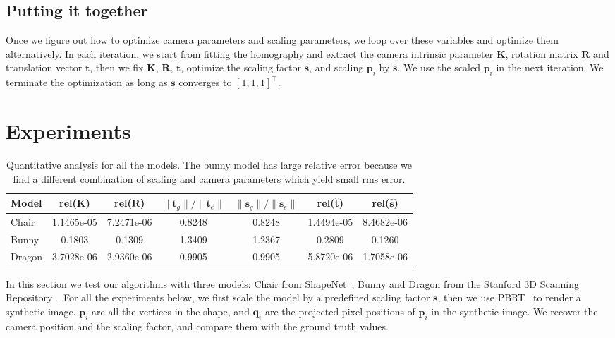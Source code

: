 \documentclass[10pt,twocolumn,letterpaper]{article}
\begin{document}
\subsection{Putting it together}

\noindent
Once we figure out how to optimize camera parameters and scaling parameters, we loop over these variables and optimize them alternatively. In each iteration, we start from fitting the homography and extract the camera intrinsic parameter $\mathbf{K}$, rotation matrix $\mathbf{R}$ and translation vector $\mathbf{t}$, then we fix $\mathbf{K}$, $\mathbf{R}$, $\mathbf{t}$, optimize the scaling factor $\mathbf{s}$, and scaling $\mathbf{p}_i$ by $\mathbf{s}$. We use the scaled $\mathbf{p}_i$ in the next iteration. We terminate the optimization as long as $\mathbf{s}$ converges to $[1,1,1]^\top$.

\section{Experiments}

\begin{table}[t]
\begin{center}
\begin{tabular}{|l|c|c|c|c|c|c|}
\hline
Model & rel($\mathbf{K}$) & rel($\mathbf{R}$) & $\|\mathbf{t}_g\|/\|\mathbf{t}_e\|$ & $\|\mathbf{s}_g\|/\|\mathbf{s}_e\|$ & rel($\hat{\mathbf{t}}$) & rel($\hat{\mathbf{s}}$) \\
\hline\hline
Chair & 1.1465e-05 & 7.2471e-06 & 0.8248 & 0.8248 & 1.4494e-05 & 8.4682e-06 \\
Bunny & 0.1803 & 0.1309 & 1.3409 & 1.2367 & 0.2809 & 0.1260 \\
Dragon & 3.7028e-06 & 2.9360e-06 & 0.9905 & 0.9905 & 5.8720e-06 & 1.7058e-06 \\
\hline
\end{tabular}
\end{center}
\caption{Quantitative analysis for all the models. The bunny model has large relative error because we find a different combination of scaling and camera parameters which yield small rms error.}
\label{tb:err}
\end{table}

\noindent
In this section we test our algorithms with three models: Chair from ShapeNet~\cite{shapenet2015}, Bunny and Dragon from the Stanford 3D Scanning Repository~\cite{stanford3d2014}. For all the experiments below, we first scale the model by a predefined scaling factor $\mathbf{s}$, then we use PBRT~\cite{pharr2010pbrt} to render a synthetic image. $\mathbf{p}_i$ are all the vertices in the shape, and $\mathbf{q}_i$ are the projected pixel positions of $\mathbf{p}_i$ in the synthetic image. We recover the camera position and the scaling factor, and compare them with the ground truth values.\\
\end{document}
